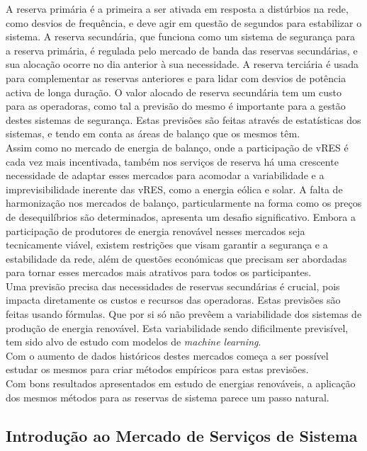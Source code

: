 A reserva primária é a primeira a ser ativada em resposta a distúrbios na rede, como desvios de frequência, e deve agir em questão de segundos para estabilizar o sistema. A reserva secundária, que funciona como um sistema de segurança para a reserva primária, é regulada pelo mercado de banda das reservas secundárias, e sua alocação ocorre no dia anterior à sua necessidade. A reserva terciária é usada para complementar as reservas anteriores e para lidar com desvios de potência activa de longa duração.
O valor alocado de reserva secundária tem um custo para as operadoras, como tal a previsão do mesmo é importante para a gestão destes sistemas de segurança. Estas previsões são feitas através de estatísticas dos sistemas, e tendo em conta as áreas de balanço que os mesmos têm.\\
Assim como no mercado de energia de balanço, onde a participação de \gls{vRES} é cada vez mais incentivada, também nos serviços de reserva há uma crescente necessidade de adaptar esses mercados para acomodar a variabilidade e a imprevisibilidade inerente das \gls{vRES}, como a energia eólica e solar. A falta de harmonização nos mercados de balanço, particularmente na forma como os preços de desequilíbrios são determinados, apresenta um desafio significativo. Embora a participação de produtores de energia renovável nesses mercados seja tecnicamente viável, existem restrições que visam garantir a segurança e a estabilidade da rede, além de questões económicas que precisam ser abordadas para tornar esses mercados mais atrativos para todos os participantes.\\

Uma previsão precisa das necessidades de reservas secundárias é crucial, pois impacta diretamente os custos e recursos das operadoras.
Estas previsões são feitas usando fórmulas. Que por si só não prevêem a variabilidade dos sistemas de produção de energia renovável. Esta variabilidade sendo dificilmente previsível, tem sido alvo de estudo com modelos de \textit{machine learning}.\\
Com o aumento de dados históricos destes mercados começa a ser possível estudar os mesmos para criar métodos empíricos para estas previsões.\\
Com bons resultados apresentados em estudo de energias renováveis, a aplicação dos mesmos métodos para as reservas de sistema parece um passo natural. \\


\subsection{Introdução ao Mercado de Serviços de Sistema \label{se:intro_servicos_sistema}}

